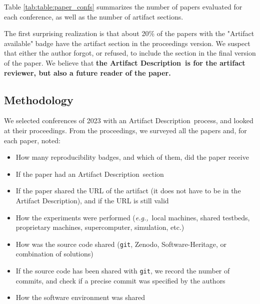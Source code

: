 \documentclass[sigconf,natbib=false]{acmart}
\newcommand{\eg}{\emph{e.g.,}}
\newcommand{\ad}{Artifact Description}
\newcommand{\todo}[1]{{\color{red}{TODO: #1}}}
\begin{document}
Table \ref{tab:table:paper_confs} summarizes the number of papers evaluated for each conference, as well as the number of artifact sections.


The first surprising realization is that about 20\% of the papers with the "Artifact available" badge have the artifact section in the proceedings version.
We suspect that either the author forgot, or refused, to include the section in the final version of the paper.
We believe that \textbf{the \ad\ is for the artifact reviewer, but also a future reader of the paper.}

\subsection{Methodology}

We selected conferences of 2023 with an \ad\ process, and looked at their proceedings.
From the proceedings, we surveyed all the papers and, for each paper, noted:

\begin{itemize}
  \item How many reproducibility badges, and which of them, did the paper receive
  \item If the paper had an \ad\ section
  \item If the paper shared the URL of the artifact (it does not have to be in the \ad), and if the URL is still valid
  \item How the experiments were performed (\eg\ local machines, shared testbeds, proprietary machines, supercomputer, simulation, etc.)
  \item How was the source code shared (\texttt{git}, Zenodo, Software-Heritage, or combination of solutions)
  \item If the source code has been shared with \texttt{git}, we record the number of commits, and check if a precise commit was specified by the authors
  \item How the software environment was shared
\end{itemize}
\end{document}
